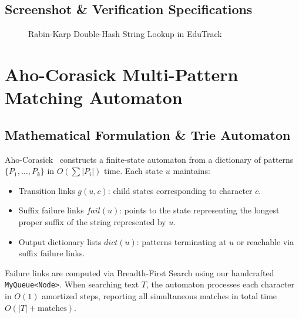 \subsection{Screenshot \& Verification Specifications}
\begin{figure}[H]
    \centering
    \caption{Rabin-Karp Double-Hash String Lookup in EduTrack}
    \label{fig:screenshot_rk}
\end{figure}

\section{Aho-Corasick Multi-Pattern Matching Automaton}
\subsection{Mathematical Formulation \& Trie Automaton}
Aho-Corasick~\cite{ahocorasick1975} constructs a finite-state automaton from a dictionary of patterns $\{P_1, \dots, P_k\}$ in $O(\sum |P_i|)$ time. Each state $u$ maintains:
\begin{itemize}
    \item Transition links $g(u, c)$: child states corresponding to character $c$.
    \item Suffix failure links $fail(u)$: points to the state representing the longest proper suffix of the string represented by $u$.
    \item Output dictionary lists $dict(u)$: patterns terminating at $u$ or reachable via suffix failure links.
\end{itemize}
Failure links are computed via Breadth-First Search using our handcrafted \texttt{MyQueue<Node>}. When searching text $T$, the automaton processes each character in $O(1)$ amortized steps, reporting all simultaneous matches in total time $O(|T| + \text{matches})$.

